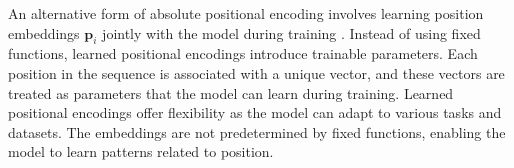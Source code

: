 



An alternative form of absolute positional encoding involves learning position embeddings $\bm{p}_i$ jointly with the model during training \citep{devlin2018bert}. Instead of using fixed functions, learned positional encodings introduce trainable parameters. Each position in the sequence is associated with a unique vector, and these vectors are treated as parameters that the model can learn during training. Learned positional encodings offer flexibility as the model can adapt to various tasks and datasets. The embeddings are not predetermined by fixed functions, enabling the model to learn patterns related to position.

